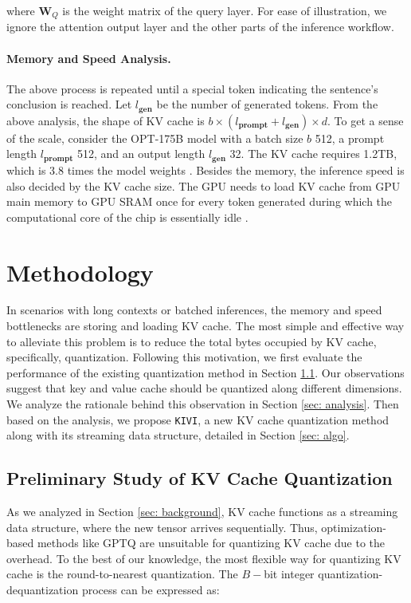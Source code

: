where ${\bm{W}}_Q$ is the weight matrix of the query layer. For ease of illustration, we ignore the attention output layer and the other parts of the inference workflow.

\paragraph{Memory and Speed Analysis.} The above process is repeated until a special token indicating the sentence's conclusion is reached. Let $l_{\textbf{gen}}$ be the number of generated tokens. From the above analysis, the shape of KV cache is $b\times (l_{\textbf{prompt}}+l_{\textbf{gen}})\times d$. To get a sense of the scale, consider the OPT-175B model with a batch size $b$ 512, a prompt length $l_{\textbf{prompt}}$ 512, and an output length $l_{\textbf{gen}}$ 32. The KV cache requires 1.2TB, which is 3.8 times the model weights \citep{flexgen}. Besides the memory, the inference speed is also decided by the KV cache size. The GPU needs to load KV cache from GPU main memory to GPU SRAM once for every token generated during which the computational core of the chip is essentially idle \citep{pope2023efficiently, vllm}.

\section{Methodology}

In scenarios with long contexts or batched inferences, the memory and speed bottlenecks are storing and loading KV cache. The most simple and effective way to alleviate this problem is to reduce the total bytes occupied by KV cache, specifically, quantization. Following this motivation, we first evaluate the performance of the existing quantization method in Section \ref{sec: quant prelim}. Our observations suggest that key and value cache should be quantized along different dimensions. We analyze the rationale behind this observation in Section \ref{sec: analysis}. Then based on the analysis, we propose \texttt{KIVI}, a new KV cache quantization method along with its streaming data structure, detailed in Section \ref{sec: algo}.

\subsection{Preliminary Study of KV Cache Quantization}
\label{sec: quant prelim}

As we analyzed in Section \ref{sec: background}, KV cache functions as a streaming data structure, where the new tensor arrives sequentially. Thus, optimization-based methods like GPTQ \citep{gptq} are unsuitable for quantizing KV cache due to the overhead. To the best of our knowledge, the most flexible way for quantizing KV cache is the round-to-nearest quantization. The $B-$bit integer quantization-dequantization process can be expressed as:

